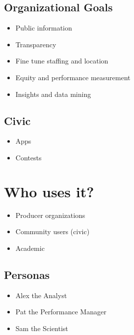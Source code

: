 \documentclass[
]{book}
\providecommand{\tightlist}{%
  \setlength{\itemsep}{0pt}\setlength{\parskip}{0pt}}
\begin{document}
\hypertarget{organizational-goals}{%
\subsection{Organizational Goals}\label{organizational-goals}}

\begin{itemize}
\tightlist
\item
  Public information
\item
  Transparency
\item
  Fine tune staffing and location
\item
  Equity and performance measurement
\item
  Insights and data mining
\end{itemize}

\hypertarget{civic}{%
\subsection{Civic}\label{civic}}

\begin{itemize}
\tightlist
\item
  Apps
\item
  Contests
\end{itemize}

\hypertarget{who-uses-it}{%
\section{Who uses it?}\label{who-uses-it}}

\begin{itemize}
\tightlist
\item
  Producer organizations
\item
  Community users (civic)
\item
  Academic
\end{itemize}

\hypertarget{personas}{%
\subsection{Personas}\label{personas}}

\begin{itemize}
\tightlist
\item
  Alex the Analyst
\item
  Pat the Performance Manager
\item
  Sam the Scientist
\end{itemize}
\end{document}
